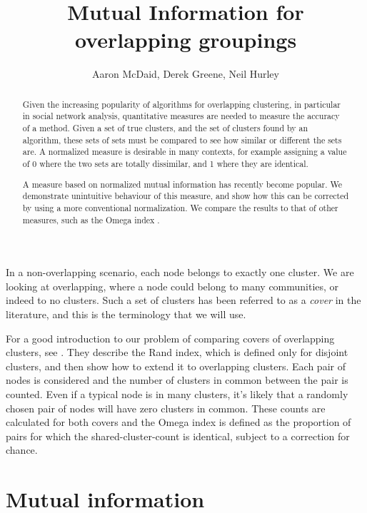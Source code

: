 \documentclass[9pt,technote]{IEEEtran}
\author{Aaron McDaid, Derek Greene, Neil Hurley}
\title{Mutual Information for overlapping groupings}
\begin{document}
\maketitle


\newcommand{\grouping}{\emph{grouping{}}}
\newcommand{\lfk}{\cite{lancichinetti-2009} {}}

\begin{abstract}
Given the increasing popularity of algorithms for overlapping clustering, in particular in social network analysis, quantitative measures are needed to measure the accuracy of a method.
Given a set of true clusters, and the set of clusters found by an algorithm, these sets of sets must be compared to see how similar or different the sets are.
A normalized measure is desirable in many contexts, for example assigning a value of 0 where the two sets are totally dissimilar, and 1 where they are identical.

A measure based on normalized mutual information has recently become popular. We demonstrate unintuitive behaviour of this measure, and show how this can be corrected
by using a more conventional normalization. We compare the results to that of other measures, such as the Omega index \cite{collins1988omega}.
\end{abstract}


In a non-overlapping scenario, each node belongs to exactly one cluster. We are looking at overlapping, where a node could belong to many communities, or indeed to no clusters.
Such a set of clusters has been referred to as a \emph{cover} in the literature, and this is the terminology that we will use.

For a good introduction to our problem of comparing covers of overlapping clusters, see \cite{collins1988omega}.
They describe the Rand index, which is defined only for disjoint clusters, and then show how to extend it to overlapping clusters.
Each pair of nodes is considered and the number of clusters in common between the pair is counted. Even if a typical node is in many clusters,
it's likely that a randomly chosen pair of nodes will have zero clusters in common.
These counts are calculated for both covers and the Omega index is defined as the proportion of pairs for which the shared-cluster-count is identical,
subject to a correction for chance.

\section{Mutual information}
\end{document}
